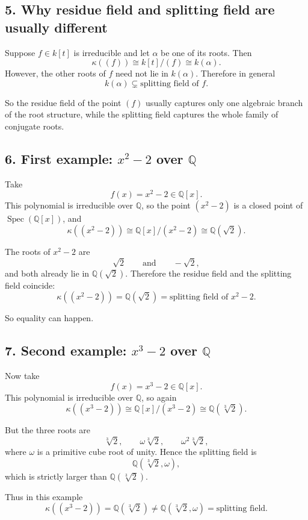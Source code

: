 \documentclass[12pt,a4paper]{article}
\theoremstyle{plain}
\theoremstyle{definition}      %
\begin{document}
\subsection*{5. Why residue field and splitting field are usually different}

Suppose \(f\in k[t]\) is irreducible and let \(\alpha\) be one of its roots. Then
\[
\kappa((f))\cong k[t]/(f)\cong k(\alpha).
\]
However, the other roots of \(f\) need not lie in \(k(\alpha)\). Therefore in general
\[
k(\alpha)\subsetneq \text{splitting field of }f.
\]

So the residue field of the point \((f)\) usually captures only one algebraic branch of the root structure, while the splitting field captures the whole family of conjugate roots.

\subsection*{6. First example: \(x^2-2\) over \(\mathbb Q\)}

Take
\[
f(x)=x^2-2\in \mathbb Q[x].
\]
This polynomial is irreducible over \(\mathbb Q\), so the point \((x^2-2)\) is a closed point of \(\operatorname{Spec}(\mathbb Q[x])\), and
\[
\kappa((x^2-2))\cong \mathbb Q[x]/(x^2-2)\cong \mathbb Q(\sqrt{2}).
\]

The roots of \(x^2-2\) are
\[
\sqrt{2}\qquad\text{and}\qquad -\sqrt{2},
\]
and both already lie in \(\mathbb Q(\sqrt{2})\). Therefore the residue field and the splitting field coincide:
\[
\kappa((x^2-2))=\mathbb Q(\sqrt{2})=\text{splitting field of }x^2-2.
\]

So equality can happen.

\subsection*{7. Second example: \(x^3-2\) over \(\mathbb Q\)}

Now take
\[
f(x)=x^3-2\in \mathbb Q[x].
\]
This polynomial is irreducible over \(\mathbb Q\), so again
\[
\kappa((x^3-2))\cong \mathbb Q[x]/(x^3-2)\cong \mathbb Q(\sqrt[3]{2}).
\]

But the three roots are
\[
\sqrt[3]{2},\qquad \omega\sqrt[3]{2},\qquad \omega^2\sqrt[3]{2},
\]
where \(\omega\) is a primitive cube root of unity. Hence the splitting field is
\[
\mathbb Q(\sqrt[3]{2},\omega),
\]
which is strictly larger than \(\mathbb Q(\sqrt[3]{2})\).

Thus in this example
\[
\kappa((x^3-2))=\mathbb Q(\sqrt[3]{2})
\neq
\mathbb Q(\sqrt[3]{2},\omega)=\text{splitting field}.
\]
\end{document}
